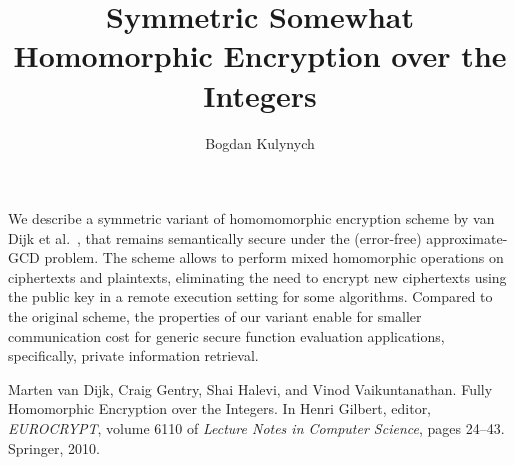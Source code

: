 \documentclass[10pt,reqno]{amsart}
\theoremstyle{plain}
\theoremstyle{definition}
\theoremstyle{remark}
\begin{document}
\title[Short title]{Symmetric Somewhat Homomorphic Encryption over the Integers}
\author{Bogdan Kulynych}
\address{National University of Kyiv-Mohyla Academy\\
         Kyiv, Ukraine}

\maketitle\thispagestyle{empty}

We describe a symmetric variant of homomomorphic encryption scheme by van Dijk et al.~\cite{DGHV10}, that remains semantically secure under the (error-free) approximate-GCD problem. The scheme allows to perform mixed homomorphic operations on ciphertexts and plaintexts, eliminating the need to encrypt new ciphertexts using the public key in a remote execution setting for some algorithms. Compared to the original scheme, the properties of our variant enable for smaller communication cost for generic secure function evaluation applications, specifically, private information retrieval.



\begin{thebibliography}{9}
Marten van Dijk, Craig Gentry, Shai Halevi, and Vinod Vaikuntanathan. Fully Homomorphic Encryption over the Integers. In Henri Gilbert, editor, \emph{EUROCRYPT}, volume 6110 of \emph{Lecture Notes in Computer Science}, pages 24–43. Springer, 2010.
\end{thebibliography}
\end{document}
